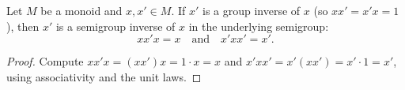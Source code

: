 \begin{lemma}
\label{lem:group-inverse-implies-semigroup-inverse}
Let \(M\) be a monoid and \(x,x'\in M\). If \(x'\) is a group inverse of \(x\) (so \(x x' = x' x = 1\)), then \(x'\) is a semigroup inverse of \(x\) in the underlying semigroup:
\[
x x' x = x \quad\text{and}\quad x' x x' = x'.
\]
\end{lemma}
\begin{proof}
Compute \(x x' x = (x x') x = 1\cdot x = x\) and \(x' x x' = x' (x x') = x' \cdot 1 = x'\), using associativity and the unit laws.
\end{proof}